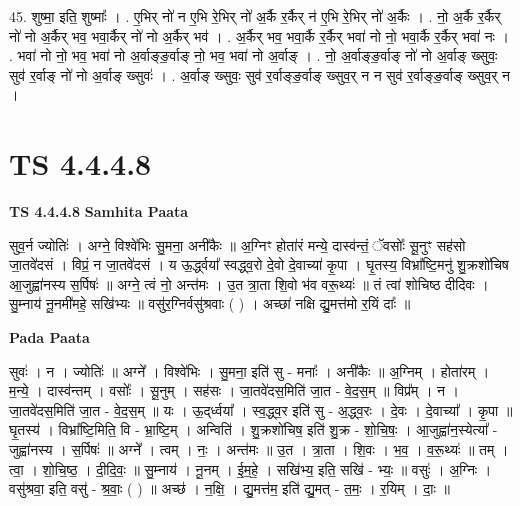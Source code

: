 \documentclass[17pt]{extarticle}
\begin{document}
45. शुष्मा॒ इति॒ शुष्माः᳚ । . ए॒भिर् नो॑ न ए॒भि रे॒भिर् नो॑ अ॒र्कै र॒र्कैर् न॑ ए॒भि रे॒भिर् नो॑ अ॒र्कैः । . नो॒ अ॒र्कै र॒र्कैर् नो॑ नो अ॒र्कैर् भव॒ भवा॒र्कैर् नो॑ नो अ॒र्कैर् भव॑ । . अ॒र्कैर् भव॒ भवा॒र्कै र॒र्कैर् भवा॑ नो नो॒ भवा॒र्कै र॒र्कैर् भवा॑ नः । . भवा॑ नो नो॒ भव॒ भवा॑ नो अ॒र्वाङ्ङ॒र्वाङ् नो॒ भव॒ भवा॑ नो अ॒र्वाङ् । . नो॒ अ॒र्वाङ्ङ॒र्वाङ् नो॑ नो अ॒र्वाङ् ख्सुवः॒ सुव॑ र॒र्वाङ् नो॑ नो अ॒र्वाङ् ख्सुवः॑ । . अ॒र्वाङ् ख्सुवः॒ सुव॑ र॒र्वाङ्ङ॒र्वाङ् ख्सुव॒र् न न सुव॑ र॒र्वाङ्ङ॒र्वाङ् ख्सुव॒र् न । \newline
\pagebreak
{}

\section{ TS 4.4.4.8 }

\textbf{TS 4.4.4.8 } \newline
\textbf{Samhita Paata} \newline

सुव॒र्न ज्योतिः॑ । अग्ने॒ विश्वे॑भिः सु॒मना॒ अनी॑कैः ॥ अ॒ग्निꣳ होता॑रं मन्ये॒ दास्व॑न्तं॒ ॅवसोः᳚ सू॒नुꣳ सह॑सो जा॒तवे॑दसं । विप्रं॒ न जा॒तवे॑दसं । य ऊ॒र्द्ध्वया᳚ स्वद्ध्व॒रो दे॒वो दे॒वाच्या॑ कृ॒पा । घृ॒तस्य॒ विभ्रा᳚ष्टि॒मनु॑ शु॒क्रशो॑चिष आ॒जुह्वा॑नस्य स॒र्पिषः॑ ॥ अग्ने॒ त्वं नो॒ अन्त॑मः । उ॒त त्रा॒ता शि॒वो भ॑व वरू॒थ्यः॑ ॥ तं त्वा॑ शोचिष्ठ दीदिवः । सु॒म्नाय॑ नू॒नमी॑महे॒ सखि॑भ्यः ॥ वसु॑र॒ग्निर्वसु॑श्रवाः ( ) । अच्छा॑ नक्षि द्यु॒मत्त॑मो र॒यिं दाः᳚ ॥ \newline

\textbf{Pada Paata} \newline

सुवः॑ । न । ज्योतिः॑ ॥ अग्ने᳚ । विश्वे॑भिः । सु॒मना॒ इति॑ सु - मनाः᳚ । अनी॑कैः ॥ अ॒ग्निम् । होता॑रम् । म॒न्ये॒ । दास्व॑न्तम् । वसोः᳚ । सू॒नुम् । सह॑सः । जा॒तवे॑दस॒मिति॑ जा॒त - वे॒द॒स॒म् ॥ विप्र᳚म् । न । जा॒तवे॑दस॒मिति॑ जा॒त - वे॒द॒स॒म् ॥ यः । ऊ॒द्‌र्ध्वया᳚ । स्व॒द्ध्व॒र इति॑ सु - अ॒द्ध्व॒रः । दे॒वः । दे॒वाच्या᳚ । कृ॒पा ॥ घृ॒तस्य॑ । विभ्रा᳚ष्टि॒मिति॒ वि - भ्रा॒ष्टि॒म् । अन्विति॑ । शु॒क्रशो॑चिष॒ इति॑ शु॒क्र - शो॒चि॒षः॒ । आ॒जुह्वा॑न॒स्येत्या᳚ - जुह्वा॑नस्य । स॒र्पिषः॑ ॥ अग्ने᳚ । त्वम् । नः॒ । अन्त॑मः ॥ उ॒त । त्रा॒ता । शि॒वः । भ॒व॒ । व॒रू॒थ्यः॑ ॥ तम् । त्वा॒ । शो॒चि॒ष्ठ॒ । दी॒दि॒वः॒ ॥ सु॒म्नाय॑ । नू॒नम् । ई॒म॒हे॒ । सखि॑भ्य॒ इति॒ सखि॑ - भ्यः॒ ॥ वसुः॑ । अ॒ग्निः । वसु॑श्रवा॒ इति॒ वसु॑ - श्र॒वाः॒ ( ) ॥ अच्छ॑ । न॒क्षि॒ । द्यु॒मत्त॑म॒ इति॑ द्यु॒मत् - त॒मः॒ । र॒यिम् । दाः॒ ॥  \newline
\end{document}
